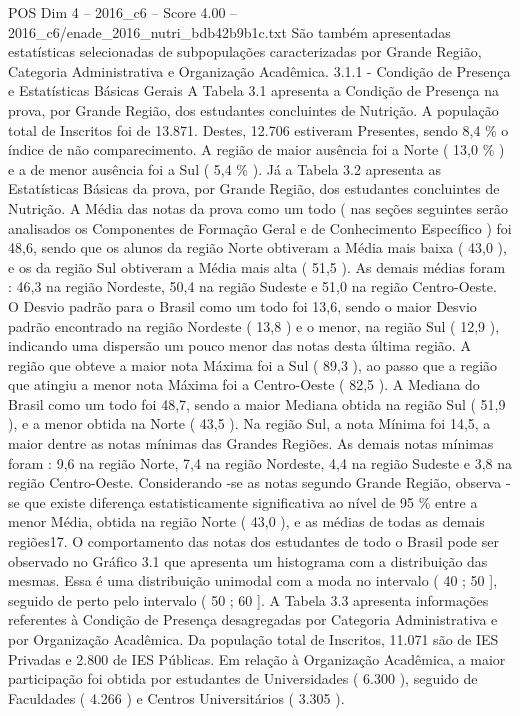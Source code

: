 \begin{textsample}{POS Dim 4 – 2016\_c6 – Score 4.00 – 2016\_c6/enade\_2016\_nutri\_bdb42b9b1c.txt}
São também apresentadas estatísticas selecionadas de subpopulações caracterizadas por Grande Região, Categoria Administrativa e Organização Acadêmica. 3.1.1 - Condição de Presença e Estatísticas Básicas Gerais A Tabela 3.1 apresenta a Condição de Presença na prova, por Grande Região, dos estudantes concluintes de Nutrição.
A população total de Inscritos foi de 13.871.
Destes, 12.706 estiveram Presentes, sendo 8,4 \% o índice de não comparecimento.
A região de maior ausência foi a Norte ( 13,0 \% ) e a de menor ausência foi a Sul ( 5,4 \% ).
Já a Tabela 3.2 apresenta as Estatísticas Básicas da prova, por Grande Região, dos estudantes concluintes de Nutrição.
A Média das notas da prova como um todo ( nas seções seguintes serão analisados os Componentes de Formação Geral e de Conhecimento Específico ) foi 48,6, sendo que os alunos da região Norte obtiveram a Média mais baixa ( 43,0 ), e os da região Sul obtiveram a Média mais alta ( 51,5 ).
As demais médias foram : 46,3 na região Nordeste, 50,4 na região Sudeste e 51,0 na região Centro-Oeste.
O Desvio padrão para o Brasil como um todo foi 13,6, sendo o maior Desvio padrão encontrado na região Nordeste ( 13,8 ) e o menor, na região Sul ( 12,9 ), indicando uma dispersão um pouco menor das notas desta última região.
A região que obteve a maior nota Máxima foi a Sul ( 89,3 ), ao passo que a região que atingiu a menor nota Máxima foi a Centro-Oeste ( 82,5 ).
A Mediana do Brasil como um todo foi 48,7, sendo a maior Mediana obtida na região Sul ( 51,9 ), e a menor obtida na Norte ( 43,5 ).
Na região Sul, a nota Mínima foi 14,5, a maior dentre as notas mínimas das Grandes Regiões.
As demais notas mínimas foram : 9,6 na região Norte, 7,4 na região Nordeste, 4,4 na região Sudeste e 3,8 na região Centro-Oeste.
Considerando -se as notas segundo Grande Região, observa -se que existe diferença estatisticamente significativa ao nível de 95 \% entre a menor Média, obtida na região Norte ( 43,0 ), e as médias de todas as demais regiões17.
O comportamento das notas dos estudantes de todo o Brasil pode ser observado no Gráfico 3.1 que apresenta um histograma com a distribuição das mesmas.
Essa é uma distribuição unimodal com a moda no intervalo ( 40 ; 50 ], seguido de perto pelo intervalo ( 50 ; 60 ].
A Tabela 3.3 apresenta informações referentes à Condição de Presença desagregadas por Categoria Administrativa e por Organização Acadêmica.
Da população total de Inscritos, 11.071 são de IES Privadas e 2.800 de IES Públicas.
Em relação à Organização Acadêmica, a maior participação foi obtida por estudantes de Universidades ( 6.300 ), seguido de Faculdades ( 4.266 ) e Centros Universitários ( 3.305 ).

\end{textsample}
